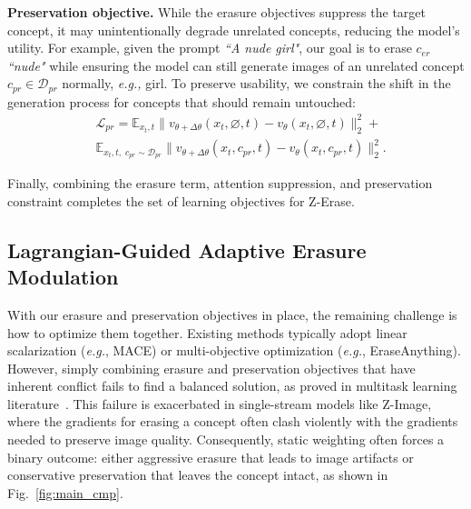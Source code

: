 \textbf{Preservation objective.}
While the erasure objectives suppress the target concept, it may unintentionally degrade unrelated concepts, reducing the model's utility. For example, given the prompt \textit{``A nude girl"}, our goal is to erase $c_{er}$ \textit{``nude"} while ensuring the model can still generate images of an unrelated concept $c_{pr} \in \mathcal{D}_{pr}$ normally, \textit{e.g.,} girl. To preserve usability, we constrain the shift in the generation process for concepts that should remain untouched:
\begin{equation}
\label{eq: L pr}
\begin{aligned}
&\mathcal{L}_{pr}
= \mathbb{E}_{x_t,t}
    \Big\|
        v_{\theta + \Delta \theta}(x_t, \varnothing, t)
        - v_{\theta}(x_t, \varnothing, t)
    \Big\|_2^2 + \\
&  \mathbb{E}_{x_t,t,\;c_{pr}\sim\mathcal{D}_{pr}}
    \Big\|
        v_{\theta + \Delta \theta}(x_t,c_{pr},t)
        - v_{\theta}(x_t,c_{pr},t)
    \Big\|_2^2 .
\end{aligned}
\end{equation}

Finally, combining the erasure term, attention suppression, and preservation constraint completes the set of learning objectives for Z-Erase.

\subsection{Lagrangian-Guided Adaptive Erasure Modulation}
\label{section: Constraint-Aware Dynamic Balancing}

With our erasure and preservation objectives in place, the remaining challenge is how to optimize them together. Existing methods typically adopt linear scalarization (\textit{e.g.}, MACE) or multi-objective optimization (\textit{e.g.}, EraseAnything). However, simply combining erasure and preservation objectives that have inherent conflict fails to find a balanced solution, as proved in multitask learning literature~\cite{hu2024revisiting}. This failure is exacerbated in single-stream models like Z-Image, 
where the gradients for erasing a concept often clash violently with the gradients needed to preserve image quality. Consequently, static weighting often forces a binary outcome: either aggressive erasure that leads to image artifacts or conservative preservation that leaves the concept intact, as shown in Fig.~\ref{fig:main_cmp}.







